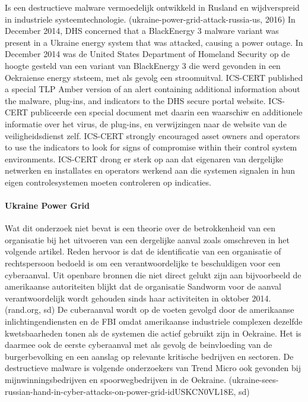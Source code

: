	Is een destructieve malware vermoedelijk ontwikkeld in Rusland en wijdverspreid in industriele
	systeemtechnologie. (ukraine-power-grid-attack-russia-us, 2016)
	In December 2014, DHS concerned that a BlackEnergy 3 malware variant was present in a
	Ukraine energy system that was attacked, causing a power outage. In December 2014 was
	de United States Department of Homeland Security op de hoogte gesteld van een variant
	van BlackEnergy 3 die werd gevonden in een Oekraiense energy ststeem, met als gevolg
	een stroomuitval.
	ICS-CERT published a special TLP Amber version of an alert containing additional
	information about the malware, plug-ins, and indicators to the DHS secure portal website.
	ICS-CERT publiceerde een special document met daarin een waarschiw en additionele
	informatie over het virus, de plug-ins, en verwijzingen naar de website van de
	veiligheidsdienst zelf.
	ICS-CERT strongly encouraged asset owners and operators to use the indicators to look for
	signs of compromise within their control system environments. ICS-CERT drong er sterk op
	aan dat eigenaren van dergelijke netwerken en installates en operators werkend aan die
	systemen signalen in hun eigen controlesystemen moeten controleren op indicaties.
	
	\paragraph{Ukraine Power Grid}
	
	Wat dit onderzoek niet bevat is een theorie over de betrokkenheid van een organisatie bij het
	uitvoeren van een dergelijke aanval zoals omschreven in het volgende artikel. Reden hervoor is dat
	de identificatie van een organisatie of rechtspersoon bedoeld is om een verantwoordelijke te
	beschuldigen voor een cyberaanval. Uit openbare bronnen die niet direct gelukt zijn aan bijvoorbeeld
	de amerikaanse autoriteiten blijkt dat de organisatie Sandworm voor de aanval verantwoordelijk
	wordt gehouden sinds haar activiteiten in oktober 2014.
	(rand.org, sd)
	De cuberaanval wordt op de voeten gevolgd door de amerikaanse inlichtingendiensten en de FBI
	omdat amerikaanse industriele complexen dezelfde kwetsbaarheden tonen als de systemen die
	actief gebruikt zijn in Oekraine. Het is daarmee ook de eerste cyberaanval met als gevolg de
	beinvloeding van de burgerbevolking en een aanslag op relevante kritische bedrijven en sectoren. De
	destructieve malware is volgende onderzoekers van Trend Micro ook gevonden bij
	mijnwinningsbedrijven en spoorwegbedrijven in de Oekraine.
	(ukraine-sees-russian-hand-in-cyber-attacks-on-power-grid-idUSKCN0VL18E, sd)

